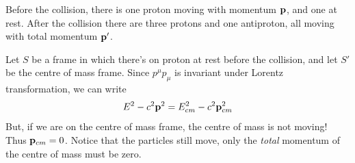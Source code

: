 \documentclass[oneside, 10pt, notitlepage]{book}
\begin{document}
Before the collision, there is one proton moving with momentum \(\vb{p}\), and one at rest. After the collision there are three protons and one antiproton, all moving with total momentum \(\vb{p}'\). 

Let \(S\) be a frame in which there's on proton at rest before the collision, and let \(S'\) be the centre of mass frame. Since \(p^{\mu}p_{\mu}\) is invariant under Lorentz transformation, we can write
\begin{equation}\label{eq:inva}
    E^2 - c^2\vb{p}^2 = E_{cm}^2 - c^2\vb{p}_{cm}^2
\end{equation} 
But, if we are on the centre of mass frame, the centre of mass is not moving! Thus \(\vb{p}_{cm}=0\). Notice that the particles still move, only the \emph{total} momentum of the centre of mass must be zero. 
\end{document}
